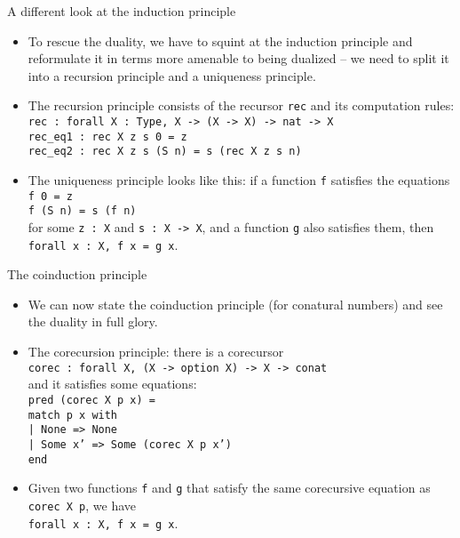 \documentclass{beamer}
\begin{document}
\begin{frame}{A different look at the induction principle}
\begin{itemize}
	\item To rescue the duality, we have to squint at the induction principle and reformulate it in terms more amenable to being dualized -- we need to split it into a recursion principle and a uniqueness principle.
	\item The recursion principle consists of the recursor \texttt{rec} and its computation rules: \\
	\texttt{rec : forall X : Type, X -> (X -> X) -> nat -> X} \\
	\texttt{rec\_eq1 : rec X z s 0 = z} \\
	\texttt{rec\_eq2 : rec X z s (S n) = s (rec X z s n)}
	\item The uniqueness principle looks like this: if a function \texttt{f} satisfies the equations \\
	\texttt{f 0 = z} \\
	\texttt{f (S n) = s (f n)} \\
	for some \texttt{z : X} and \texttt{s : X -> X}, and a function \texttt{g} also satisfies them, then \texttt{forall x : X, f x = g x}.
\end{itemize}
\end{frame}

\begin{frame}{The coinduction principle}
\begin{itemize}
	\item We can now state the coinduction principle (for conatural numbers) and see the duality in full glory.
	\item The corecursion principle: there is a corecursor \\
	\texttt{corec : forall X, (X -> option X) -> X -> conat} \\
	and it satisfies some equations: \\
	\texttt{pred (corec X p x) =\\
	match p x with \\
	| None => None \\
	| Some x' => Some (corec X p x') \\
	end}
	\item Given two functions \texttt{f} and \texttt{g} that satisfy the same corecursive equation as \texttt{corec X p}, we have \\
	\texttt{forall x : X, f x = g x}.
\end{itemize}
\end{frame}
\end{document}
